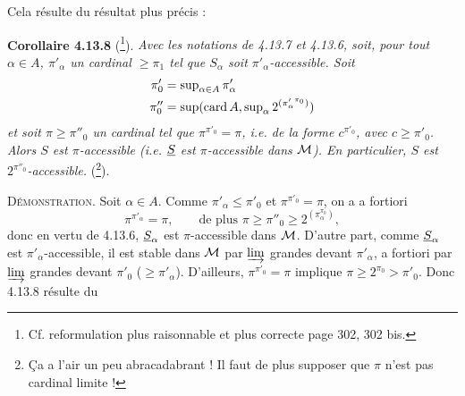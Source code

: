 Cela résulte du résultat plus précis :

\textbf{Corollaire 4.13.8} (\footnote[122]{Cf. reformulation plus raisonnable et plus correcte page 302, 302 bis.}). \textit{Avec les notations de 4.13.7 et 4.13.6, soit, pour tout $\alpha \in A$, $\pi'_\alpha$ un cardinal $\geqslant \pi_1$ tel que $S_\alpha$ soit $\pi'_\alpha$-accessible. Soit}
\[
\begin{aligned}
\pi'_0 &= \sup\nolimits_{\alpha\in A} \pi'_\alpha \\
\pi''_0 &= \sup(\operatorname{card} A, \sup\nolimits_\alpha 2^{({\pi'_\alpha}^{\pi_0})})
\end{aligned}
\]
\textit{et soit $\pi \geqslant \pi''_0$ un cardinal tel que $\pi^{\pi'_0} = \pi$, i.e. de la forme $c^{\pi'_0}$, avec $c \geqslant \pi'_0$. Alors $S$ est $\pi$-accessible (i.e. $\underline{S}$ est $\pi$-accessible dans $\mathcal{M}$). En particulier, $S$ est $2^{\pi''_0}$-accessible.} (\footnote[123]{Ça a l'air un peu abracadabrant ! Il faut de plus supposer que $\pi$ n'est pas cardinal limite !}).

\textsc{Démonstration}. Soit $\alpha \in A$. Comme $\pi'_\alpha \leqslant \pi'_0$ et $\pi^{\pi'_0} = \pi$, on a a fortiori
\[
\pi^{\pi'_\alpha} = \pi , \qquad \text{de plus } \pi \geqslant \pi''_0 \geqslant 2^{(\pi_\alpha^{\pi_0})} , %
\]
donc en vertu de 4.13.6, $\underline{S}_\alpha$ est $\pi$-accessible dans $\mathcal{M}$. D'autre part, comme $\underline{S}_\alpha$ est $\pi'_\alpha$-accessible, il est stable dans $\mathcal{M}$ par $\varinjlim$ grandes devant $\pi'_\alpha$, a fortiori par $\varinjlim$ grandes devant $\pi'_0$ ($\geqslant \pi'_\alpha$). D'ailleurs, $\pi^{\pi'_0} = \pi$ implique $\pi \geqslant 2^{\pi_0} > \pi'_0$. Donc 4.13.8 résulte du

